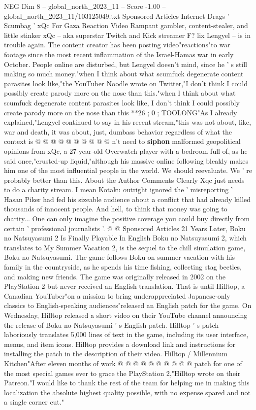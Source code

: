 \begin{textsample}{NEG Dim 8 – global\_north\_2023\_11 – Score -1.00 – global\_north\_2023\_11/103125049.txt}  \label{ex:f8_neg_331}
Sponsored Articles Internet Drags ' Scumbag ' xQc For Gaza Reaction Video Rampant gambler, content-stealer, and little stinker xQc -- aka superstar Twitch and Kick streamer F? lix Lengyel -- is in trouble again.
The content creator has been posting video"reactions"to war footage since the most recent inflammation of the Israel-Hamas war in early October.
People online are disturbed, but Lengyel doesn't mind, since he ' s still making so much money."when I think about what scumfuck degenerate content parasites look like,"the YouTuber Noodle wrote on Twitter,"I don't think I could possibly create parody more on the nose than this."when I think about what scumfuck degenerate content parasites look like, I don't think I could possibly create parody more on the nose than this **26 ; 0 ; TOOLONG"As I already explained,"Lengyel continued to say in his recent stream,"this was not about, like, war and death, it was about, just, dumbass behavior regardless of what the context is @ @ @ @ @ @ @ @ @ @ n't need to \textbf{siphon} malformed geopolitical opinions from xQc, a 27-year-old Overwatch player with a bedroom full of, as he said once,"crusted-up liquid,"although his massive online following bleakly makes him one of the most influential people in the world.
We should reevaluate.
We ' re probably better than this.
About the Author Comments Clearly Xqc just needs to do a charity stream.
I mean Kotaku outright ignored the ' misreporting ' Hasan Piker had fed his sizeable audience about a conflict that had already killed thousands of innocent people.
And hell, to think that money was going to charity...
One can only imagine the positive coverage you could buy directly from certain ' professional journalists '. @ @ Sponsored Articles 21 Years Later, Boku no Natsuyasumi 2 Is Finally Playable In English Boku no Natsuyasumi 2, which translates to My Summer Vacation 2, is the sequel to the chill simulation game, Boku no Natsuyasumi.
The game follows Boku on summer vacation with his family in the countryside, as he spends his time fishing, collecting stag beetles, and making new friends.
The game was originally released in 2002 on the PlayStation 2 but never received an English translation.
That is until Hilltop, a Canadian YouTuber"on a mission to bring underappreciated Japanese-only classics to English-speaking audiences"released an English patch for the game.
On Wednesday, Hilltop released a short video on their YouTube channel announcing the release of Boku no Natsuyasumi ' s English patch.
Hilltop ' s patch laboriously translates 5,000 lines of text in the game, including its user interface, menus, and item icons.
Hilltop provides a download link and instructions for installing the patch in the description of their video.
Hilltop / Millennium Kitchen"After eleven months of work @ @ @ @ @ @ @ @ @ @ patch for one of the most special games ever to grace the PlayStation 2,"Hilltop wrote on their Patreon."I would like to thank the rest of the team for helping me in making this localization the absolute highest quality possible, with no expense spared and not a single corner cut."

\end{textsample}
